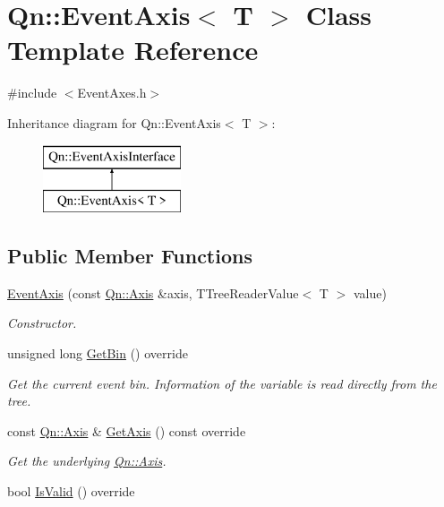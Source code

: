 \hypertarget{classQn_1_1EventAxis}{}\section{Qn\+:\+:Event\+Axis$<$ T $>$ Class Template Reference}
\label{classQn_1_1EventAxis}


{\ttfamily \#include $<$Event\+Axes.\+h$>$}

Inheritance diagram for Qn\+:\+:Event\+Axis$<$ T $>$\+:\begin{figure}[H]
\begin{center}
\leavevmode
\includegraphics[height=2.000000cm]{classQn_1_1EventAxis}
\end{center}
\end{figure}
\subsection*{Public Member Functions}
\begin{DoxyCompactItemize}
\item 
\mbox{\hyperlink{classQn_1_1EventAxis_a801e914dd851f39aeab25b048d95a039}{Event\+Axis}} (const \mbox{\hyperlink{classQn_1_1Axis}{Qn\+::\+Axis}} \&axis, T\+Tree\+Reader\+Value$<$ T $>$ value)
\begin{DoxyCompactList}\small\item\em Constructor. \end{DoxyCompactList}\item 
unsigned long \mbox{\hyperlink{classQn_1_1EventAxis_af5799b86d0e326c4d7b2e31e4a6ba086}{Get\+Bin}} () override
\begin{DoxyCompactList}\small\item\em Get the current event bin. Information of the variable is read directly from the tree. \end{DoxyCompactList}\item 
const \mbox{\hyperlink{classQn_1_1Axis}{Qn\+::\+Axis}} \& \mbox{\hyperlink{classQn_1_1EventAxis_a7fba5bcfeb2877ced0aa0006ce82d26c}{Get\+Axis}} () const override
\begin{DoxyCompactList}\small\item\em Get the underlying \mbox{\hyperlink{classQn_1_1Axis}{Qn\+::\+Axis}}. \end{DoxyCompactList}\item 
bool \mbox{\hyperlink{classQn_1_1EventAxis_a503c69f641f36b6717ffc167b53abd56}{Is\+Valid}} () override
\end{DoxyCompactItemize}



